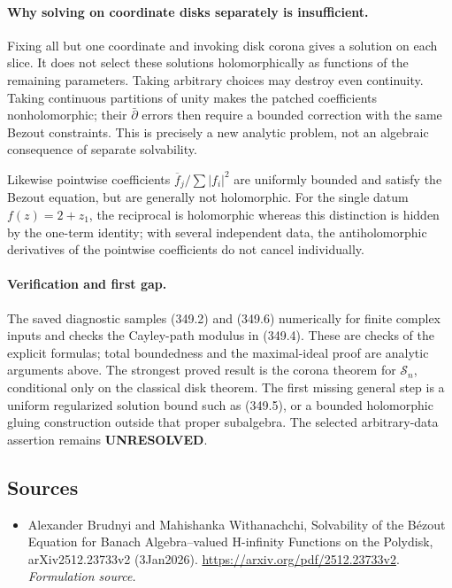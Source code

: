 \documentclass[11pt]{article}
\begin{document}
\paragraph{Why solving on coordinate disks separately is insufficient.}
Fixing all but one coordinate and invoking disk corona gives a
solution on each slice. It does not select these solutions
holomorphically as functions of the remaining parameters. Taking
arbitrary choices may destroy even continuity. Taking continuous
partitions of unity makes the patched coefficients nonholomorphic;
their $\bar\partial$ errors then require a bounded correction with
the same Bezout constraints. This is precisely a new analytic
problem, not an algebraic consequence of separate solvability.

Likewise pointwise coefficients $\overline f_j/\sum|f_i|^2$ are
uniformly bounded and satisfy the Bezout equation, but are generally
not holomorphic. For the single datum $f(z)=2+z_1$, the reciprocal
is holomorphic whereas this distinction is hidden by the one-term
identity; with several independent data, the antiholomorphic
derivatives of the pointwise coefficients do not cancel individually.

\paragraph{Verification and first gap.}
The saved diagnostic samples (349.2) and (349.6) numerically for
finite complex inputs and checks the Cayley-path modulus in (349.4).
These are checks of the explicit formulas; total boundedness and the
maximal-ideal proof are analytic arguments above. The strongest
proved result is the corona theorem for $\mathcal S_n$, conditional
only on the classical disk theorem. The first missing general step
is a uniform regularized solution bound such as (349.5), or a bounded
holomorphic gluing construction outside that proper subalgebra.
The selected arbitrary-data assertion remains \textbf{UNRESOLVED}.
\subsection{Sources}
\begin{itemize}
\item[S1]Alexander Brudnyi and Mahishanka Withanachchi, Solvability of the Bézout Equation for Banach Algebra–valued H-infinity Functions on the Polydisk, arXiv2512.23733v2 (3Jan2026).
\url{https://arxiv.org/pdf/2512.23733v2}.
\textit{Formulation source.}
\end{itemize}
\end{document}
